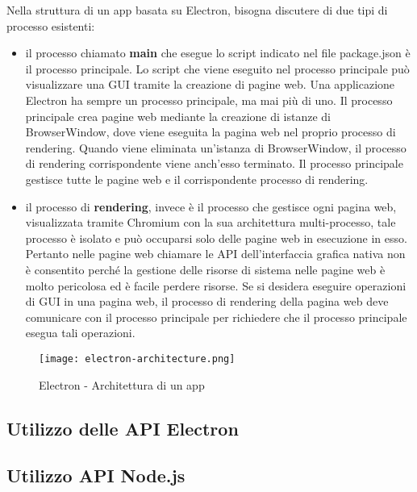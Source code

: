 Nella struttura di un app basata su Electron, bisogna discutere di due tipi di processo esistenti:
\begin{itemize}
	\item  il processo chiamato \textbf{main} che esegue lo script indicato nel file package.json è il processo principale. Lo script che viene eseguito nel processo principale può visualizzare una \Gls{GUI} tramite la creazione di pagine web. Una applicazione Electron ha sempre un 		processo principale, ma mai più di uno. Il processo principale crea pagine web mediante la creazione di istanze di BrowserWindow, dove viene eseguita la pagina web nel proprio processo di rendering. Quando viene eliminata un'istanza di BrowserWindow, il processo di 		rendering corrispondente viene anch'esso terminato. Il processo principale gestisce tutte le pagine web e il corrispondente processo di rendering.
	\item il processo di \textbf{rendering}, invece è il processo che gestisce ogni pagina web, visualizzata tramite Chromium con la sua architettura multi-processo, tale processo è isolato e può occuparsi solo delle pagine web in esecuzione in esso.
	Pertanto nelle pagine web chiamare le API dell'interfaccia grafica nativa non è consentito perché la gestione delle risorse di sistema nelle pagine web è molto pericolosa ed è facile perdere risorse. Se si desidera eseguire operazioni di \Gls{GUI} in una pagina web, il processo di 		rendering della pagina web deve comunicare con il processo principale per richiedere che il processo principale esegua tali operazioni.
\end{itemize}

\begin{figure}[H]
    \centering
    \texttt{[image: electron-architecture.png]}
    \caption{Electron - Architettura di un app}
    \label{fig:ElectronArch}
\end{figure}


\subsection{Utilizzo delle API Electron}



\subsection{Utilizzo API Node.js}



